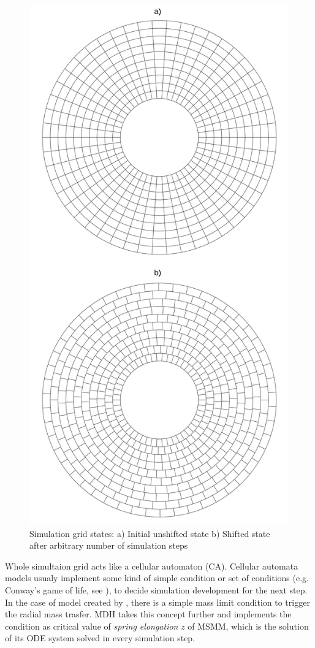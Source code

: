 \begin{figure}
\centering
\includegraphics[width=0.75\columnwidth]{img/grid_states.png}
\caption{Simulation grid states: a) Initial unshifted state b) Shifted state after arbitrary number of simulation steps}
\label{fig:grid_states}
\end{figure}

Whole simultaion grid acts like a cellular automaton (CA). Cellular automata models usualy implement some kind of simple condition or set of conditions (e.g. Conway's game of life, see \cite{gardner1970}), to decide simulation development for the next step. In the case of model created by \cite{yonehara1997}, there is a simple mass limit condition to trigger the radial mass trasfer. MDH takes this concept further and implements the condition as critical value of \emph{spring elongation} $z$ of MSMM, which is the solution of its ODE system solved in every simulation step. 

